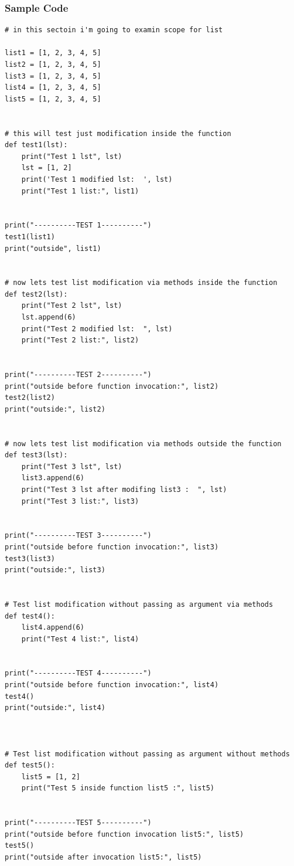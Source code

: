\documentclass[11pt]{article}
\begin{document}
\subsubsection{Sample Code}
\label{sec:orgb05b6ce}

\begin{verbatim}
# in this sectoin i'm going to examin scope for list

list1 = [1, 2, 3, 4, 5]
list2 = [1, 2, 3, 4, 5]
list3 = [1, 2, 3, 4, 5]
list4 = [1, 2, 3, 4, 5]
list5 = [1, 2, 3, 4, 5]


# this will test just modification inside the function
def test1(lst):
    print("Test 1 lst", lst)
    lst = [1, 2]
    print('Test 1 modified lst:  ', lst)
    print("Test 1 list:", list1)


print("----------TEST 1----------")
test1(list1)
print("outside", list1)


# now lets test list modification via methods inside the function
def test2(lst):
    print("Test 2 lst", lst)
    lst.append(6)
    print("Test 2 modified lst:  ", lst)
    print("Test 2 list:", list2)


print("----------TEST 2----------")
print("outside before function invocation:", list2)
test2(list2)
print("outside:", list2)


# now lets test list modification via methods outside the function
def test3(lst):
    print("Test 3 lst", lst)
    list3.append(6)
    print("Test 3 lst after modifing list3 :  ", lst)
    print("Test 3 list:", list3)


print("----------TEST 3----------")
print("outside before function invocation:", list3)
test3(list3)
print("outside:", list3)


# Test list modification without passing as argument via methods
def test4():
    list4.append(6)
    print("Test 4 list:", list4)


print("----------TEST 4----------")
print("outside before function invocation:", list4)
test4()
print("outside:", list4)



# Test list modification without passing as argument without methods
def test5():
    list5 = [1, 2]
    print("Test 5 inside function list5 :", list5)


print("----------TEST 5----------")
print("outside before function invocation list5:", list5)
test5()
print("outside after invocation list5:", list5)


\end{verbatim}
\end{document}
